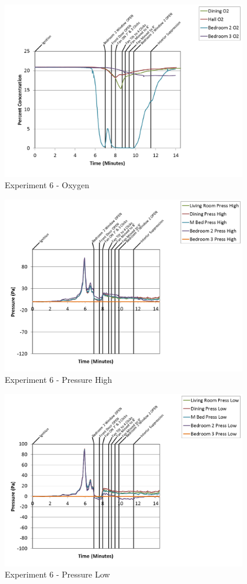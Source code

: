 \documentclass{article}
\begin{document}
\begin{appendices}
\begin{figure}[h!]
	\centering
	\includegraphics[height=3.05in]{0_Images/Results_Charts/Exp_6_Charts/Oxygen.png}
	\caption{Experiment 6 - Oxygen}
\end{figure}

\clearpage

\begin{figure}[h!]
	\centering
	\includegraphics[height=3.05in]{0_Images/Results_Charts/Exp_6_Charts/PressureHigh.png}
	\caption{Experiment 6 - Pressure High}
\end{figure}


\begin{figure}[h!]
	\centering
	\includegraphics[height=3.05in]{0_Images/Results_Charts/Exp_6_Charts/PressureLow.png}
	\caption{Experiment 6 - Pressure Low}
\end{figure}


\end{appendices}
\end{document}
